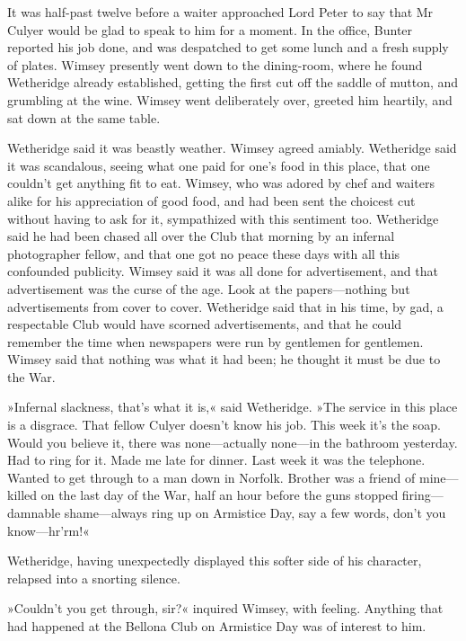 It was half-past twelve before a waiter approached Lord Peter to say that Mr Culyer would be glad to speak to him for a moment. In the office, Bunter reported his job done, and was despatched to get some lunch and a fresh supply of plates. Wimsey presently went down to the dining-room, where he found Wetheridge already established, getting the first cut off the saddle of mutton, and grumbling at the wine. Wimsey went deliberately over, greeted him heartily, and sat down at the same table.

Wetheridge said it was beastly weather. Wimsey agreed amiably. Wetheridge said it was scandalous, seeing what one paid for one's food in this place, that one couldn't get anything fit to eat. Wimsey, who was adored by chef and waiters alike for his appreciation of good food, and had been sent the choicest cut without having to ask for it, sympathized with this sentiment too. Wetheridge said he had been chased all over the Club that morning by an infernal photographer fellow, and that one got no peace these days with all this confounded publicity. Wimsey said it was all done for advertisement, and that advertisement was the curse of the age. Look at the papers\allowbreak---\allowbreak nothing but advertisements from cover to cover. Wetheridge said that in his time, by gad, a respectable Club would have scorned advertisements, and that he could remember the time when newspapers were run by gentlemen for gentlemen. Wimsey said that nothing was what it had been; he thought it must be due to the War.

»Infernal slackness, that's what it is,« said Wetheridge. »The service in this place is a disgrace. That fellow Culyer doesn't know his job. This week it's the soap. Would you believe it, there was none\allowbreak---\allowbreak actually none\allowbreak---\allowbreak in the bathroom yesterday. Had to ring for it. Made me late for dinner. Last week it was the telephone. Wanted to get through to a man down in Norfolk. Brother was a friend of mine\allowbreak---\allowbreak killed on the last day of the War, half an hour before the guns stopped firing\allowbreak---\allowbreak damnable shame\allowbreak---\allowbreak always ring up on Armistice Day, say a few words, don't you know\allowbreak---\allowbreak hr'rm!«

Wetheridge, having unexpectedly displayed this softer side of his character, relapsed into a snorting silence.

»Couldn't you get through, sir?« inquired Wimsey, with feeling. Anything that had happened at the Bellona Club on Armistice Day was of interest to him.

